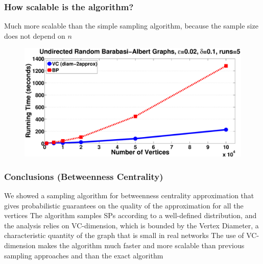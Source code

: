 \documentclass[aspectratio=169]{beamer}
\begin{document}
\begin{frame}
  \frametitle{How scalable is the algorithm?}
  Much more scalable than the simple sampling algorithm, because the sample
  size does not depend on $n$
  \vfill
  \begin{figure}[H]
    \centering
    \includegraphics[scale=0.22]{figs/random-time}
  \end{figure}
\end{frame}

\begin{frame}
  \frametitle{Conclusions (Betweenness Centrality)}
  \vfill
  We showed a sampling algorithm for betweenness centrality approximation that
  gives probabilistic guarantees on the quality of the approximation for all
  the vertices
  \vfill
  The algorithm samples SPs according to a well-defined distribution, and
  the analysis relies on VC-dimension, which is bounded by the Vertex Diameter,
  a characteristic quantity of the graph that is small in real networks
  \vfill
  The use of VC-dimension makes the algorithm much faster and more scalable
  than previous sampling approaches and than the exact algorithm
\end{frame}







\end{document}
